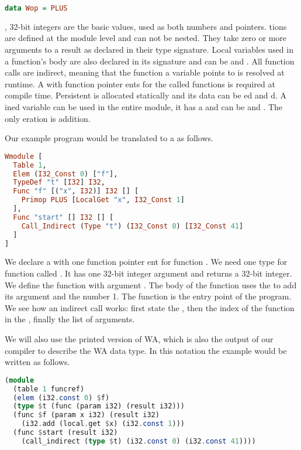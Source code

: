 {\begin{lstlisting}[language=Haskell]
data Wop = PLUS
\end{lstlisting}

, 32-bit integers are the basic values, used as both numbers and pointers. tions are defined at the module level and can not be nested. They take zero or more arguments to a result as declared in their type signature. Local variables used in a function's body are also declared in its signature and can be  and . All function calls are indirect, meaning that the function a variable points to is resolved at runtime. A  with function pointer ents for the called functions is required at compile time. Persistent  is allocated statically and its data can be ed and d. A ined variable can be used in the entire module, it has a  and can be  and . The only eration is addition.

Our example program  would be translated to a  as follows.

\begin{lstlisting}[language=Haskell]
Wmodule [
  Table 1,
  Elem (I32_Const 0) ["f"],
  TypeDef "t" [I32] I32,
  Func "f" [("x", I32)] I32 [] [
    Primop PLUS [LocalGet "x", I32_Const 1]
  ],
  Func "start" [] I32 [] [
    Call_Indirect (Type "t") (I32_Const 0) [I32_Const 41]
  ]
]
\end{lstlisting}

We declare a  with one function pointer ent for function . We need one type for function  called . It has one 32-bit integer argument and returns a 32-bit integer. We define the function  with argument . The body of the function uses the   to add its argument and the number 1. The function  is the entry point of the program. We see how an indirect call works: first state the , then the index of the function in the , finally the list of arguments.

We will also use the printed version of \ac{WA}, which is also the output of our compiler to describe the \ac{WA} data type. In this notation the example would be written as follows.

\begin{lstlisting}[language=Haskell]
(module
  (table 1 funcref)
  (elem (i32.const 0) $f)
  (type $t (func (param i32) (result i32)))
  (func $f (param x i32) (result i32)
    (i32.add (local.get $x) (i32.const 1)))
  (func $start (result i32)
    (call_indirect (type $t) (i32.const 0) (i32.const 41))))
\end{lstlisting}

}
